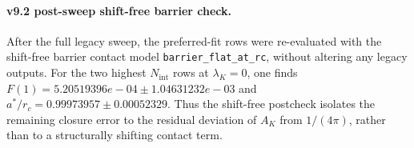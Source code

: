 \paragraph{v9.2 post-sweep shift-free barrier check.}
After the full legacy sweep, the preferred-fit rows were re-evaluated with the shift-free barrier contact model \texttt{barrier\_flat\_at\_rc}, without altering any legacy outputs. For the two highest $N_{\mathrm{int}}$ rows at $\lambda_K=0$, one finds $F(1) = 5.20519396e-04 \pm 1.04631232e-03$ and $a^*/r_c = 0.99973957 \pm 0.00052329$. Thus the shift-free postcheck isolates the remaining closure error to the residual deviation of $A_K$ from $1/(4\pi)$, rather than to a structurally shifting contact term.

